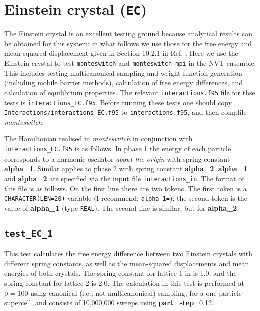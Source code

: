 \documentclass{report}
\begin{document}
\section{Einstein crystal (\texttt{EC})}
The Einstein crystal is an excellent testing ground because analytical results can be obtained for this system:
in what follows we use those for the free energy and mean-squared displacement given in Section 10.2.1 in Ref.
\cite{book:Frenkel}. Here we use the Einstein crystal to test \texttt{monteswitch} and \texttt{monteswitch\_mpi}
in the NVT ensemble. This includes testing multicanonical sampling and weight function generation (including
mobile barrier methods), calculation of free energy differences, and calculation of equilibrium properties.
The relevant \texttt{interactions.f95} file for thse tests is \texttt{interactions\_EC.f95}. Before running these 
tests one should copy \texttt{Interactions/interactions\_EC.f95} to \texttt{interactions.f95}, and then complile 
\emph{monteswitch}. 

The Hamiltonian realised in \emph{monteswitch} in conjunction with \texttt{interactions\_EC.f95} is 
as follows. In phase 1 the energy of each particle corresponds to a harmonic oscilator \emph{about the origin} with spring constant 
\textbf{alpha\_1}. Similar applies to phase 2 with spring constant \textbf{alpha\_2}. \textbf{alpha\_1} and \textbf{alpha\_2} 
are specified via the input file \texttt{interactions\_in}. The format of this file is as follows. On the first line there are two tokens. 
The first token is a \texttt{CHARACTER(LEN=20)} variable (I recommend: \texttt{alpha\_1=}); the second token is the 
value of \textbf{alpha\_1} (type \texttt{REAL}). The second line is similar, but for \textbf{alpha\_2}.


\subsection{\texttt{test\_EC\_1}}
This test calculates the free energy difference between two Einstein crystals with different spring constants,
as well as the mean-squared displacements and mean energies of both crystals. The spring constant for lattice 
1 in is 1.0, and the spring constant for lattice 2 is 2.0. The calculation in this test is 
performed at $\beta=100$ using canonical (i.e., not multicanonical) sampling, for a one particle supercell, and 
consists of 10,000,000 sweeps using \textbf{part\_step}=0.12.
\end{document}
